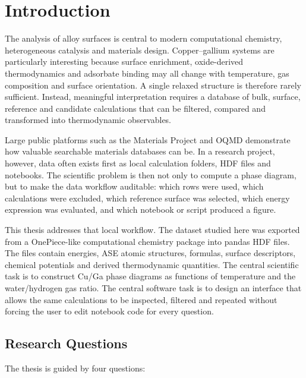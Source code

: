 \documentclass[12pt,a4paper,oneside]{report}
\begin{document}
\tableofcontents
\listoffigures
\listoftables

\chapter{Introduction}

The analysis of alloy surfaces is central to modern computational chemistry,
heterogeneous catalysis and materials design. Copper--gallium systems are
particularly interesting because surface enrichment, oxide-derived
thermodynamics and adsorbate binding may all change with temperature, gas
composition and surface orientation. A single relaxed structure is therefore
rarely sufficient. Instead, meaningful interpretation requires a database of
bulk, surface, reference and candidate calculations that can be filtered,
compared and transformed into thermodynamic observables.

Large public platforms such as the Materials Project and OQMD demonstrate how
valuable searchable materials databases can be. In a research project, however,
data often exists first as local calculation folders, HDF files and notebooks.
The scientific problem is then not only to compute a phase diagram, but to make
the data workflow auditable: which rows were used, which calculations were
excluded, which reference surface was selected, which energy expression was
evaluated, and which notebook or script produced a figure.

This thesis addresses that local workflow. The dataset studied here was exported
from a OnePiece-like computational chemistry package into pandas HDF files. The
files contain energies, ASE atomic structures, formulas, surface descriptors,
chemical potentials and derived thermodynamic quantities. The central scientific
task is to construct Cu/Ga phase diagrams as functions of temperature and the
water/hydrogen gas ratio. The central software task is to design an interface
that allows the same calculations to be inspected, filtered and repeated
without forcing the user to edit notebook code for every question.

\section{Research Questions}

The thesis is guided by four questions:
\end{document}
